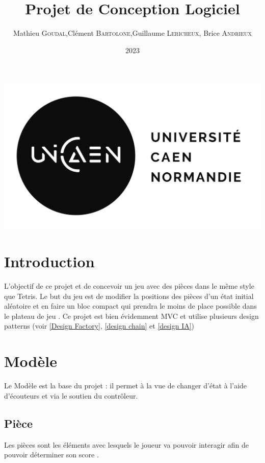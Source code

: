 \documentclass[a4paper,12pt]{article} %
\begin{document}
\renewcommand{\contentsname}{Sommaire}
\title{Projet de Conception Logiciel }
\author{Mathieu \textsc{Goudal},Clément \textsc{Bartolone},Guillaume \textsc{Lericheux}, Brice \textsc{Andrieux}}
\date{2023}
\maketitle
\begin{center}
\includegraphics[scale=0.5]{images/UNICAEN.png}
\end{center}

\newpage
\tableofcontents
\newpage
\section{Introduction}
L'objectif de ce projet et de concevoir un jeu avec des pièces dans le même style que Tetris.
Le but du jeu est de modifier la positions des pièces d'un état initial aléatoire et en faire un bloc compact qui prendra le moins de place possible dans le plateau de jeu .
Ce projet est bien évidemment MVC et utilise plusieurs design patterns (voir \ref{Design Factory}, \ref{design chain} et \ref{design IA})

\section{Modèle}
Le Modèle est la base du projet : il permet à la vue de changer d’état à l'aide d'écouteurs et via le soutien du contrôleur.
\subsection{Pièce}
Les pièces sont les éléments avec lesquels le joueur va pouvoir interagir afin de pouvoir déterminer son score .
\end{document}
